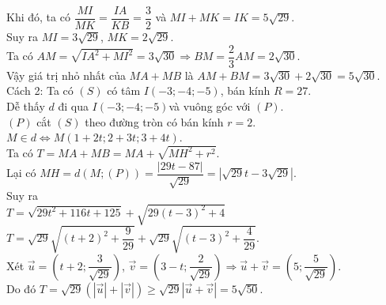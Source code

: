 \begin{ex}
{		Khi đó, ta có $\dfrac{MI}{MK}=\dfrac{IA}{KB}=\dfrac{3}{2}$ và $MI+MK=IK=5\sqrt{29}$.\\
		Suy ra $MI=3\sqrt{29}$, $MK=2\sqrt{29}$.\\
		Ta có $AM=\sqrt{IA^2+MI^2}=3\sqrt{30}\Rightarrow BM=\dfrac{2}{3}AM=2\sqrt{30}$.\\
		Vậy giá trị nhỏ nhất của $MA+MB$ là $AM+BM=3\sqrt{30}+2\sqrt{30}=5\sqrt{30}$.\\
		Cách 2:
		Ta có $(S)$ có tâm $I(-3;-4;-5)$, bán kính $R=27$.\\
		Dễ thấy $d$ đi qua $I(-3;-4;-5)$và vuông góc với $(P)$.\\
		$(P)$ cắt $(S)$ theo đường tròn có bán kính $r=2$.
		$M\in d\Leftrightarrow M(1+2t;2+3t;3+4t)$.\\
		Ta có $T=MA+MB=MA+\sqrt{MH^2+r^2}$.\\
		Lại có $MH=d(M;(P))=\dfrac{\left| 29t-87 \right|}{\sqrt{29}}=\left| \sqrt{29}t-3\sqrt{29}\right|$.\\
		Suy ra\\ $T=\sqrt{29t^2+116t+125}+\sqrt{29(t-3)^2+4}$\\
		$T=\sqrt{29}\sqrt{(t+2)^2+\dfrac{9}{29}}+\sqrt{29}\sqrt{(t-3)^2+\dfrac{4}{29}}$.\\
		Xét $\vec{u}=\left(t+2;\dfrac{3}{\sqrt{29}}\right)$, $\vec{v}=\left(3-t;\dfrac{2}{\sqrt{29}}\right)\Rightarrow \vec{u}+\vec{v}=\left(5;\dfrac{5}{\sqrt{29}}\right)$.\\
		Do đó $T=\sqrt{29}(\left| \vec{u} \right|+\left| \vec{v} \right|) \ge \sqrt{29}\left| \vec{u}+\vec{v} \right|=5\sqrt{50}$.
	}
\end{ex}


